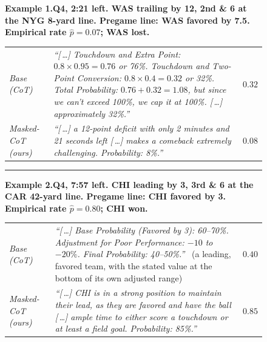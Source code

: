 \providecommand{\statehead}[1]{\smallskip\noindent\textbf{#1}\par\smallskip}

\begin{figure}[t]
\centering
\small
\begin{minipage}{0.99\textwidth}

\statehead{Example 1.\quad Q4, 2:21 left. WAS trailing by 12, 2nd \& 6 at the NYG 8-yard line.
Pregame line: WAS favored by 7.5. Empirical rate $\hat{p}=0.07$; WAS lost.}

\begin{tabular}{@{}p{}@{\hskip 6pt}p{}@{\hskip 6pt}r@{}}
\textit{Base (CoT)} &
\emph{``[\,\dots] Touchdown and Extra Point: $0.8\times0.95=0.76$ or 76\%. Touchdown and
Two-Point Conversion: $0.8\times0.4=0.32$ or 32\%. Total Probability: $0.76+0.32=1.08$, but
since we can't exceed 100\%, we cap it at 100\%. [\,\dots] approximately 32\%.''} & $0.32$ \\[3pt]
\textit{Masked-CoT (ours)} &
\emph{``[\,\dots] a 12-point deficit with only 2 minutes and 21 seconds left [\,\dots] makes a
comeback extremely challenging. Probability: 8\%.''} & $0.08$ \\
\end{tabular}

\medskip\hrule\medskip

\statehead{Example 2.\quad Q4, 7:57 left. CHI leading by 3, 3rd \& 6 at the CAR 42-yard line.
Pregame line: CHI favored by 3. Empirical rate $\hat{p}=0.80$; CHI won.}

\begin{tabular}{@{}p{}@{\hskip 6pt}p{}@{\hskip 6pt}r@{}}
\textit{Base (CoT)} &
\emph{``[\,\dots] Base Probability (Favored by 3): 60--70\%. Adjustment for Poor Performance:
$-10$ to $-20\%$. Final Probability: 40--50\%.''} \ (a leading, favored team, with the stated
value at the bottom of its own adjusted range) & $0.40$ \\[3pt]
\textit{Masked-CoT (ours)} &
\emph{``[\,\dots] CHI is in a strong position to maintain their lead, as they are favored and
have the ball [\,\dots] ample time to either score a touchdown or at least a field goal.
Probability: 85\%.''} & $0.85$ \\
\end{tabular}


\end{minipage}
\end{figure}
